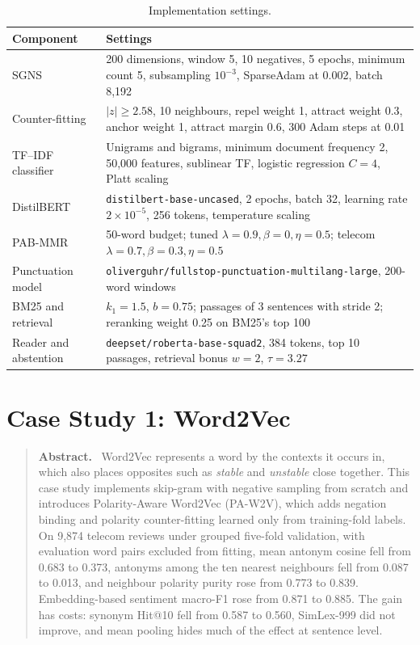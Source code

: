 \documentclass[11pt,a4paper]{article}
\newenvironment{csabstract}{\begin{quote}\small\textbf{Abstract.}\ }{\end{quote}}
\begin{document}
\begin{table}[H]\centering\footnotesize
\caption{Implementation settings.}\label{tab:settings}
\begin{tabular}{p{3.3cm}p{11.0cm}}
\toprule
Component & Settings\\
\midrule
SGNS & 200 dimensions, window 5, 10 negatives, 5 epochs, minimum count 5, subsampling $10^{-3}$, SparseAdam at 0.002, batch 8,192\\
Counter-fitting & $|z|\ge 2.58$, 10 neighbours, repel weight 1, attract weight 0.3, anchor weight 1, attract margin 0.6, 300 Adam steps at 0.01\\
TF--IDF classifier & Unigrams and bigrams, minimum document frequency 2, 50,000 features, sublinear TF, logistic regression $C=4$, Platt scaling\\
DistilBERT & \texttt{distilbert-base-uncased}, 2 epochs, batch 32, learning rate $2\times10^{-5}$, 256 tokens, temperature scaling\\
PAB-MMR & 50-word budget; tuned $\lambda=0.9,\beta=0,\eta=0.5$; telecom $\lambda=0.7,\beta=0.3,\eta=0.5$\\
Punctuation model & \texttt{oliverguhr/fullstop-punctuation-multilang-large}, 200-word windows\\
BM25 and retrieval & $k_1=1.5$, $b=0.75$; passages of 3 sentences with stride 2; reranking weight 0.25 on BM25's top 100\\
Reader and abstention & \texttt{deepset/roberta-base-squad2}, 384 tokens, top 10 passages, retrieval bonus $w=2$, $\tau=3.27$\\
\bottomrule
\end{tabular}
\end{table}

\section{Case Study 1: Word2Vec}\label{sec:w2v}
\begin{csabstract}
Word2Vec represents a word by the contexts it occurs in, which also places opposites such as \emph{stable} and \emph{unstable} close together. This case study implements skip-gram with negative sampling from scratch and introduces Polarity-Aware Word2Vec (PA-W2V), which adds negation binding and polarity counter-fitting learned only from training-fold labels. On 9,874 telecom reviews under grouped five-fold validation, with evaluation word pairs excluded from fitting, mean antonym cosine fell from 0.683 to 0.373, antonyms among the ten nearest neighbours fell from 0.087 to 0.013, and neighbour polarity purity rose from 0.773 to 0.839. Embedding-based sentiment macro-F1 rose from 0.871 to 0.885. The gain has costs: synonym Hit@10 fell from 0.587 to 0.560, SimLex-999 did not improve, and mean pooling hides much of the effect at sentence level.
\end{csabstract}
\end{document}
